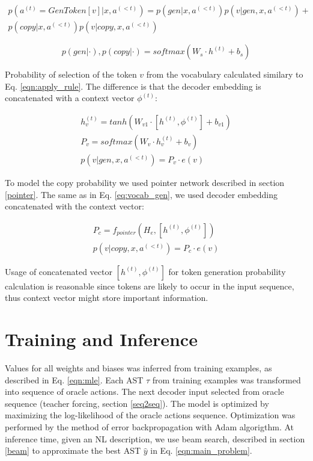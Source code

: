 \begin{equation}
\begin{gathered}
    p(a^{(t)} = GenToken[v]|x,a^{(<t)}) = p(gen|x, a^{(<t)}) p(v|gen, x, a^{(<t)}) + \\
    p(copy|x, a^{(<t)}) p(v|copy, x, a^{(<t)})
\end{gathered}
\end{equation}

\begin{equation}
    p(gen|\cdot), p(copy|\cdot) = softmax(W_s\cdot h^{(t)} + b_s)
\end{equation}

Probability of selection of the token $v$ from the vocabulary calculated similary to Eq. \ref{eqn:apply_rule}. The difference is that the decoder embedding is concatenated with a context vector $\phi^{(t)}$:

\begin{equation}
\begin{gathered}
    h^{(t)}_v = tanh(W _{v1}\cdot [h^{(t)}, \phi^{(t)}] + b_{v1}) \\
    P_v = softmax(W_v\cdot h^{(t)}_v  + b_v) \\
    p(v|gen, x, a^{(<t)}) = P_v\cdot e(v)
\end{gathered}
\label{eq:vocab_gen}
\end{equation}

To model the copy probability we used pointer network \parencite{Vinyals2015} described in section \ref{pointer}. The same as in Eq. \ref{eq:vocab_gen}, we used decoder embedding concatenated with the context vector:

\begin{equation}
\begin{gathered}
    P_c = f_{pointer}(H_e, [h^{(t)}, \phi^{(t)}]) \\
    p(v|copy, x, a^{(<t)}) = P_c \cdot e(v)
\end{gathered}
\end{equation}

Usage of concatenated vector $[h^{(t)}, \phi^{(t)}]$ for token generation probability calculation is reasonable since tokens are likely to occur in the input sequence, thus context vector might store important information.

\section{Training and Inference}

Values for all weights and biases was inferred from training examples, as described in Eq. \ref{eqn:mle}. Each AST $\tau$ from training examples was transformed into sequence of oracle actions. The next decoder input selected from oracle sequence (teacher forcing, section \ref{seq2seq}). The model is  optimized by maximizing the log-likelihood of the oracle actions sequence. Optimization was performed by the method of error backpropagation with Adam \parencite{Kingma2014} algorigthm. At inference time, given an NL description, we use beam search, described in section \ref{beam} to approximate the best AST $\hat{y}$ in Eq. \ref{eqn:main_problem}.



